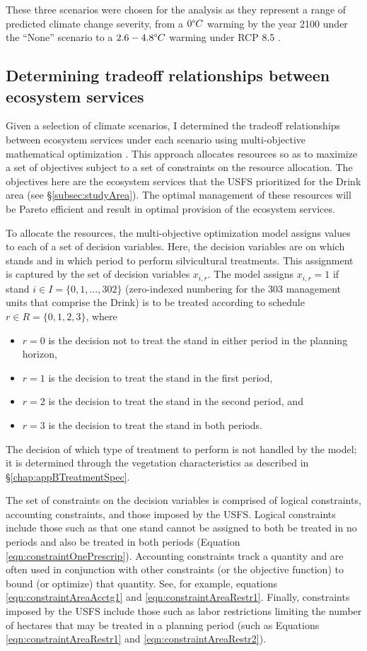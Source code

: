 These three scenarios were chosen for the analysis as they represent a range of predicted climate change severity, from a $0 \degree C$ warming by the year 2100 under the ``None'' scenario to a $2.6-4.8 \degree C$ warming under RCP 8.5 \cite{ipcc2013climate}.

\subsection{Determining tradeoff relationships between ecosystem services}
\label{subsec:whyUsingMultiObjModel}
Given a selection of climate scenarios, I determined the tradeoff relationships between ecosystem services under each scenario using multi-objective mathematical optimization \cite{TothFsci2009}. This approach allocates resources so as to maximize a set of objectives subject to a set of constraints on the resource allocation. The objectives here are the ecosystem services that the USFS prioritized for the Drink area (see \S \ref{subsec:studyArea}). The optimal management of these resources will be Pareto efficient and result in optimal provision of the ecosystem services.

To allocate the resources, the multi-objective optimization model assigns values to each of a set of decision variables. Here, the decision variables are on which stands and in which period to perform silvicultural treatments. This assignment is captured by the set of decision variables $x_{i,r}$. The model assigns $x_{i,r} = 1$ if stand $i \in I = \{0,1,\ldots,302\}$ (zero-indexed numbering for the 303 management units that comprise the Drink) is to be treated according to schedule $r \in R = \{0,1,2,3\}$, where
\begin{itemize}
\item $r = 0$ is the decision not to treat the stand in either period in the planning horizon,\item $r = 1$ is the decision to treat the stand in the first period,
\item $r = 2$ is the decision to treat the stand in the second period, and
\item $r = 3$ is the decision to treat the stand in both periods.
\end{itemize}
The decision of which type of treatment to perform is not handled by the model; it is determined through the vegetation characteristics as described in \S \ref{chap:appBTreatmentSpec}.

The set of constraints on the decision variables is comprised of logical constraints, accounting constraints, and those imposed by the USFS. Logical constraints include those such as that one stand cannot be assigned to both be treated in no periods and also be treated in both periods (Equation \ref{eqn:constraintOnePrescrip}). Accounting constraints track a quantity and are often used in conjunction with other constraints (or the objective function) to bound (or optimize) that quantity. See, for example, equations \ref{eqn:constraintAreaAcctg1} and \ref{eqn:constraintAreaRestr1}. Finally, constraints imposed by the USFS include those such as labor restrictions limiting the number of hectares that may be treated in a planning period (such as Equations \ref{eqn:constraintAreaRestr1} and \ref{eqn:constraintAreaRestr2}).

